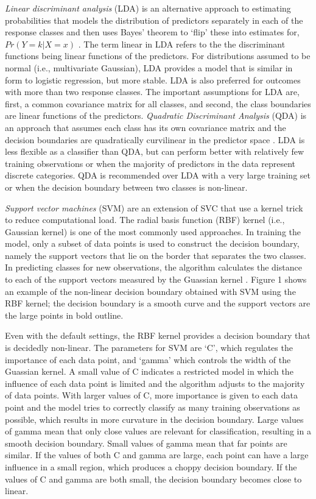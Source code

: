 \emph{Linear discriminant analysis} (LDA) is an alternative approach to 
estimating probabilities that models the distribution of predictors 
separately in each of the response classes and then uses Bayes' theorem 
to `flip' these into estimates for, $Pr(Y=k | X=x)$ \cite{james13}. The term 
linear in LDA refers to the the discriminant functions being linear functions 
of the predictors. For distributions assumed to be normal (i.e., multivariate 
Gaussian), LDA provides a model that is similar in form to logistic regression, 
but more stable. LDA is also preferred for outcomes with more than two response 
classes. The important assumptions for LDA are, first, a common covariance 
matrix for all classes, and second, the class boundaries are linear functions 
of the predictors. \emph{Quadratic Discriminant Analysis} (QDA) is an approach 
that assumes each class has its own covariance matrix and the decision 
boundaries are quadratically curvilinear in the predictor space \cite{kuhn13}. 
LDA is less flexible as a classifier than QDA, but can perform better with 
relatively few training observations or when the majority of predictors in the 
data represent discrete categories. QDA is recommended over LDA with a very 
large training set or when the decision boundary between two classes is 
non-linear. 


\emph{Support vector machines} (SVM) are an extension of SVC that use a 
kernel trick to reduce computational load. The radial basis function (RBF) 
kernel (i.e., Gaussian kernel) is one of the most commonly used approaches. 
In training the model, only a subset of data points is used to construct the 
decision boundary, namely the support vectors that lie on the border that 
separates the two classes. In predicting classes for new observations, the 
algorithm calculates the distance to each of the support vectors measured 
by the Guassian kernel \cite{muller17}. Figure 1 shows an example of the 
non-linear decision boundary obtained with SVM using the RBF kernel; the 
decision boundary is a smooth curve and the support vectors are the large 
points in bold outline. 

Even with the default settings, the RBF kernel provides a decision boundary 
that is decidedly non-linear. The parameters 
for SVM are `C', which regulates the importance of each data point, and 
`gamma' which controls the width of the Guassian kernel. A small value of 
C indicates a restricted model in which the influence of each data point is 
limited and the algorithm adjusts to the majority of data points. With larger 
values of C, more importance is given to each data point and the model tries 
to correctly classify as many training observations as possible, which results 
in more curvature in the decision boundary. Large values of gamma mean that 
only close values are relevant for classification, resulting in a smooth 
decision boundary. Small values of gamma mean that far points are similar. 
If the values of both C and gamma are large, each point can have a large 
influence in a small region, which produces a choppy decision boundary. 
If the values of C and gamma are both small, the decision boundary becomes 
close to linear.

